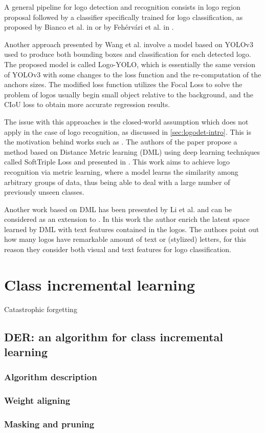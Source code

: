 A general pipeline for logo detection and recognition consists in logo region proposal followed by a classifier specifically trained for logo classification, as proposed by Bianco et al. in \cite{bianco2017deep} or by Fehérvári et al. in \cite{fehervari2019scalable}.

Another approach presented by Wang et al. \cite{wang2022logodet} involve a model based on YOLOv3 \cite{redmon2018yolov3} used to produce both bounding boxes and classification for each detected logo. The proposed model is called Logo-YOLO, which is essentially the same version of YOLOv3 with some changes to the loss function and the re-computation of the anchors sizes. The modified loss function utilizes the Focal Loss \cite{lin2017focal} to solve the problem of logos usually begin small object relative to the background, and the  CIoU loss \cite{zheng2020distance} to obtain more accurate regression results.

The issue with this approaches is the closed-world assumption which does not apply in the case of logo recognition, as discussed in \autoref{sec:logodet-intro}. This is the motivation behind works such as \cite{fehervari2019scalable}. The authors of the paper propose a method based on Distance Metric learning (DML) using deep learning techniques called SoftTriple Loss and presented in \cite{qian2019softtriple}. This work aims to achieve logo recognition via metric learning, where a model learns the similarity among arbitrary groups of data, thus being able to deal with a large number of previously unseen classes.

Another work based on DML has been presented by Li et al. \cite{li2022seetek} and can be considered as an extension to \cite{fehervari2019scalable}. In this work the author enrich the latent space learned by DML with text features contained in the logos. The authors point out how many logos have remarkable amount of text or (stylized) letters, for this reason they consider both visual and text features for logo classification.

\section{Class incremental learning}
Catastrophic forgetting
\subsection{DER: an algorithm for class incremental learning}
\subsubsection{Algorithm description}
\subsubsection{Weight aligning}
\subsubsection{Masking and pruning}
